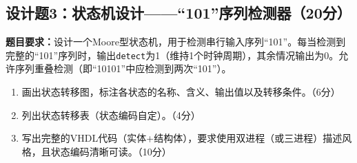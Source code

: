 \subsection*{设计题3：状态机设计——``101''序列检测器（20分）}

\begin{framed}
\textbf{题目要求：}设计一个Moore型状态机，用于检测串行输入序列``101''。每当检测到完整的``101''序列时，输出\texttt{detect}为1（维持1个时钟周期），其余情况输出为0。允许序列重叠检测（即``10101''中应检测到两次``101''）。

\begin{enumerate}[label=(\arabic*)]
  \item 画出状态转移图，标注各状态的名称、含义、输出值以及转移条件。（6分）
  \item 列出状态转移表（状态编码自定）。（4分）
  \item 写出完整的VHDL代码（实体+结构体），要求使用双进程（或三进程）描述风格，且状态编码清晰可读。（10分）
\end{enumerate}
\end{framed}
